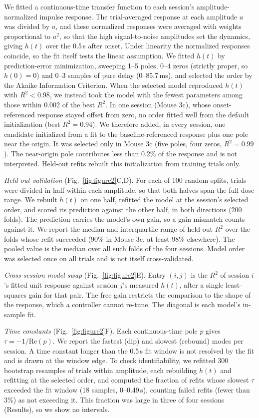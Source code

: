 We fitted a continuous-time transfer function to each session's amplitude-normalized impulse response.
The trial-averaged response at each amplitude $a$ was divided by $a$, and these normalized responses were averaged with weights proportional to $a^{2}$, so that the high signal-to-noise amplitudes set the dynamics, giving $h(t)$ over the 0.5\,s after onset.
Under linearity the normalized responses coincide, so the fit itself tests the linear assumption.
We fitted $h(t)$ by prediction-error minimization, sweeping 1--5 poles, 0--4 zeros (strictly proper, so $h(0) = 0$) and 0--3 samples of pure delay (0--85.7\,ms), and selected the order by the Akaike Information Criterion.
When the selected model reproduced $h(t)$ with $R^{2} < 0.98$, we instead took the model with the fewest parameters among those within 0.002 of the best $R^{2}$.
In one session (Mouse 3c), whose onset-referenced response stayed offset from zero, no order fitted well from the default initialization (best $R^2 = 0.94$).
We therefore added, in every session, one candidate initialized from a fit to the baseline-referenced response plus one pole near the origin.
It was selected only in Mouse 3c (five poles, four zeros, $R^{2} = 0.99$).
The near-origin pole contributes less than 0.2\% of the response and is not interpreted.
Held-out refits rebuilt this initialization from training trials only.

\emph{Held-out validation} (Fig.~\ref{fig:figure2}C,D).
For each of 100 random splits, trials were divided in half within each amplitude, so that both halves span the full dose range.
We rebuilt $h(t)$ on one half, refitted the model at the session's selected order, and scored its prediction against the other half, in both directions (200 folds).
The prediction carries the model's own gain, so a gain mismatch counts against it.
We report the median and interquartile range of held-out $R^{2}$ over the folds whose refit succeeded (90\% in Mouse 3c, at least 98\% elsewhere).
The pooled value is the median over all such folds of the four sessions.
Model order was selected once on all trials and is not itself cross-validated.

\emph{Cross-session model swap} (Fig.~\ref{fig:figure2}E).
Entry $(i,j)$ is the $R^{2}$ of session $i$'s fitted unit response against session $j$'s measured $h(t)$, after a single least-squares gain for that pair.
The free gain restricts the comparison to the shape of the response, which a controller cannot re-tune.
The diagonal is each model's in-sample fit.

\emph{Time constants} (Fig.~\ref{fig:figure2}F).
Each continuous-time pole $p$ gives $\tau = -1/\mathrm{Re}(p)$.
We report the fastest (dip) and slowest (rebound) modes per session.
A time constant longer than the 0.5\,s fit window is not resolved by the fit and is drawn at the window edge.
To check identifiability, we refitted 300 bootstrap resamples of trials within amplitude, each rebuilding $h(t)$ and refitting at the selected order, and computed the fraction of refits whose slowest $\tau$ exceeded the fit window (18 samples, 0--0.49\,s), counting failed refits (fewer than 3\%) as not exceeding it.
This fraction was large in three of four sessions (Results), so we show no intervals.

